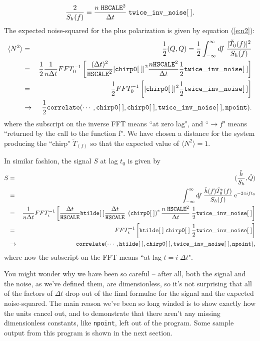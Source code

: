 \begin{equation}
{2 \over S_h(f)} = { n \; {\tt HSCALE}^2 \over \Delta t} \; {\tt twice\_inv\_noise[\;]}.
\end{equation}
The expected noise-squared for the plus polarization is given by
equation (\ref{e:n2}):
\begin{eqnarray*}
\langle N^2 \rangle &=& {1 \over 2} (Q,Q)  = {1 \over 2} \int_{-\infty}^\infty df\;
{| \tilde T_{0}(f)|^2 \over S_h(f)} \\
&=&
{1 \over 2} {1 \over n \Delta t} FFT^{-1}_0 \left[
 {(\Delta t)^2 \over {\tt HSCALE}^2}  |{\tt chirp0[\;]} |^2 
{n {\tt HSCALE}^2 \over \Delta t} {1 \over 2} {\tt twice\_inv\_noise[\; ] } \right] \\
& = & {1 \over 2} FFT^{-1}_0 \left[ |{\tt chirp0[\;]} |^2 {1 \over 2} {\tt twice\_inv\_noise[\; ] } \right] \\
& \rightarrow & {1 \over 2} {\tt
correlate(\cdots,chirp0[\;],chirp0[\;],twice\_inv\_noise[\;],npoint)}.
\end{eqnarray*}
where the subscript on the inverse FFT means ``at zero lag", and
``$\rightarrow f$" means ``returned by the call to the function f".  We
have chosen a distance for the system producing the ``chirp" $\tilde
T_(f)$ so that the expected value of $\langle N^2 \rangle=1$.

In similar fashion, the signal $S$ at lag $t_0 $ is given
by
\begin{eqnarray}
   \nonumber
S  & = & ({\tilde h \over S_h}, \tilde Q) \\
    \nonumber
    & = & \int_{-\infty}^\infty df\;
       {\tilde h(f) \tilde T^*_{0}(f)  \over S_h(f)} \;
       {\rm e}^{-2 \pi i f t_0} \\
   \nonumber
   & = & {1 \over n \Delta t} FFT^{-1}_{i}\left[ {\Delta t \over {\tt
       HSCALE}} {\tt htilde[\;]} {\Delta t  \over {\tt HSCALE}} \;
       \left( {\tt chirp0[\;]} \right)^* { n \; {\tt HSCALE}^2 \over
       \Delta t } \; {1 \over 2} {\tt twice\_inv\_noise[\;]} \right] \\
\nonumber
   & = & FFT^{-1}_{i} \left[ {\tt htilde[\;]} \; {\tt chirp0[\;]} \;
   {1 \over 2} {\tt twice\_inv\_noise[\;]} \right]\\
& \rightarrow & {\tt
correlate(\cdots,htilde[\;],chirp0[\;],twice\_inv\_noise[\;],npoint)},
\end{eqnarray}
where now the subscript on the FFT means ``at lag $t = i \; \Delta t$".

You might wonder why we have been so careful -- after all, both the
signal and the noise, as we've defined them, are dimensionless, so it's
not surprising that all of the factors of $\Delta t$ drop out of the
final formulae for the signal and the expected noise-squared.  The main
reason we've been so long winded is to show exactly how the units cancel out,
and to demonstrate that there aren't any missing dimensionless constants,
like {\tt npoint}, left out of the program.  Some sample output from
this program is shown in the next section.
\clearpage
{}
\clearpage


